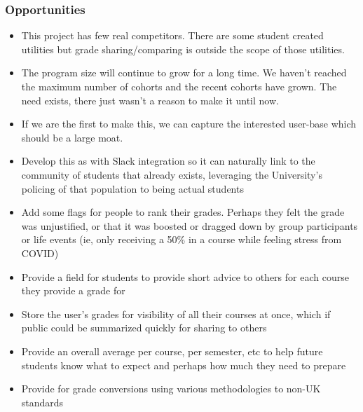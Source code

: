 \documentclass{article}
\begin{document}
\subsubsection{Opportunities}
\begin{itemize}
    \item This project has few real competitors. There are some student created utilities but grade sharing/comparing is outside the scope of those utilities.
    \item The program size will continue to grow for a long time. We haven't reached the maximum number of cohorts and the recent cohorts have grown. The need exists, there just wasn't a reason to make it until now.
    \item If we are the first to make this, we can capture the interested user-base which should be a large moat.
    \item Develop this as with Slack integration so it can naturally link to the community of students that already exists, leveraging the University's policing of that population to being actual students
    \item Add some flags for people to rank their grades. Perhaps they felt the grade was unjustified, or that it was boosted or dragged down by group participants or life events (ie, only receiving a 50\% in a course while feeling stress from COVID)
    \item Provide a field for students to provide short advice to others for each course they provide a grade for
    \item Store the user's grades for visibility of all their courses at once, which if public could be summarized quickly for sharing to others
    \item Provide an overall average per course, per semester, etc to help future students know what to expect and perhaps how much they need to prepare
    \item Provide for grade conversions using various methodologies to non-UK standards
\end{itemize}
\end{document}
